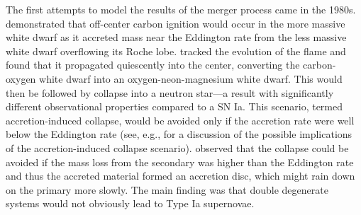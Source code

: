 \documentclass[12pt]{article}
\begin{document}
The first attempts to model the results of the merger process came in the
1980s. \cite{nomotoiben:1985} demonstrated that off-center carbon
ignition would occur in the more massive white dwarf as it accreted
mass near the Eddington rate from the less massive white dwarf
overflowing its Roche lobe. \cite{saionomoto:1985} tracked the
evolution of the flame and found that it propagated quiescently into
the center, converting the carbon-oxygen white dwarf into an
oxygen-neon-magnesium white dwarf. This would then be followed by
collapse into a neutron star---a result with significantly different
observational properties compared to a SN Ia. This scenario, termed
accretion-induced collapse, would be avoided only if the accretion
rate were well below the Eddington rate (see, e.g., \cite{fryer:1999}
for a discussion of the possible implications of the accretion-induced 
collapse scenario). \cite{tutukov-yungelson:1979}
observed that the collapse could be avoided if the mass loss from the secondary
was higher than the Eddington rate and thus the accreted material
formed an accretion disc, which might rain down on the primary more
slowly. The main finding was that double degenerate systems would not
obviously lead to Type Ia supernovae.
\end{document}
